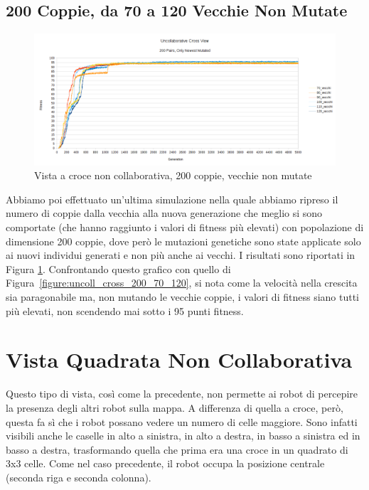 \subsection{200 Coppie, da 70 a 120 Vecchie Non Mutate}
\begin{figure}[ht]
	\centering
	\includegraphics[scale=0.7,angle=90]{imgs/uncollaborative_cross_200_pairs_70_120_vecchi_solo_nuovi_mutati.png}
	\caption{Vista a croce non collaborativa, 200 coppie, vecchie non mutate}
	\label{figure:uncoll_cross_200_70_120_vecchi_non_mutati}
\end{figure}
Abbiamo poi effettuato un'ultima simulazione nella quale abbiamo ripreso il
numero di coppie dalla vecchia alla nuova generazione che meglio si sono
comportate (che hanno raggiunto i valori di fitness più elevati) con popolazione
di dimensione 200 coppie, dove però le mutazioni genetiche sono state applicate
solo ai nuovi individui generati e non più anche ai vecchi.\newline
I risultati sono riportati in Figura
\ref{figure:uncoll_cross_200_70_120_vecchi_non_mutati}. Confrontando questo
grafico con quello di Figura~\ref{figure:uncoll_cross_200_70_120}, si nota come
la velocità nella crescita sia paragonabile ma, non mutando le vecchie coppie, i
valori di fitness siano tutti più elevati, non scendendo mai sotto i 95 punti
fitness.



\clearpage



\section{Vista Quadrata Non Collaborativa}
Questo tipo di vista, così come la precedente, non permette ai robot di
percepire la presenza degli altri robot sulla mappa. A differenza di quella a
croce, però, questa fa sì che i robot possano vedere un numero di celle
maggiore. Sono infatti visibili anche le caselle in alto a sinistra, in alto a
destra, in basso a sinistra ed in basso a destra, trasformando quella che prima
era una croce in un quadrato di 3x3 celle. Come nel caso precedente, il robot
occupa la posizione centrale (seconda riga e seconda colonna).

